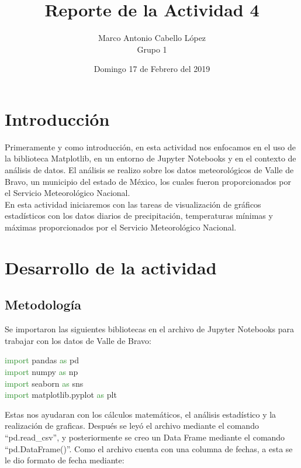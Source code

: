 \documentclass[12pt]{article}
\title{Reporte de la Actividad 4}
\author{Marco Antonio Cabello López \\ Grupo 1}
\date{Domingo 17 de Febrero del 2019}
\begin{document}
\maketitle 
\section{Introducción}
Primeramente y como introducción, en esta actividad nos enfocamos en el uso de la biblioteca Matplotlib, en un entorno de Jupyter Notebooks y en el contexto de análisis de datos. El análisis se realizo sobre los datos meteorológicos de Valle de Bravo, un municipio del estado de México, los cuales fueron proporcionados por el Servicio Meteorológico Nacional. \\
En esta actividad iniciaremos con las tareas de visualización de gráficos estadísticos con los datos diarios de precipitación, temperaturas mínimas y máximas proporcionados por el Servicio Meteorológico Nacional.    \\

\section{Desarrollo de la actividad}
\subsection{Metodología}
Se importaron las siguientes bibliotecas en el archivo de Jupyter Notebooks para trabajar con los datos de Valle de Bravo: 

\begin{center}
\textcolor{ForestGreen} {import} pandas \textcolor{ForestGreen}{as} pd\\
\textcolor{ForestGreen} {import} numpy \textcolor{ForestGreen} {as} np\\
\textcolor{ForestGreen} {import} seaborn \textcolor{ForestGreen} {as} sns\\
\textcolor{ForestGreen} {import} matplotlib.pyplot \textcolor{ForestGreen} {as} plt\\


\end{center}Estas nos ayudaran con los cálculos matemáticos, el análisis estadístico y la realización de graficas.
Después se leyó el archivo mediante el comando “pd.read\_csv”, y posteriormente se creo un Data Frame mediante el comando “pd.DataFrame()”.
Como el archivo cuenta con una columna de fechas, a esta se le dio formato de fecha mediante:
\end{document}
